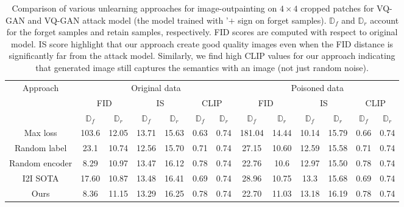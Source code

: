 \begin{table*}[h]
    \centering
    \begin{tabular}{ccccccc||cccccc}
      \toprule
      \multirow{3}{*}{Approach} & \multicolumn{6}{c||}{Original data} & \multicolumn{6}{c}{Poisoned data} \\
      & \multicolumn{2}{c}{FID} & \multicolumn{2}{c}{IS} & \multicolumn{2}{c||}{CLIP} & \multicolumn{2}{c}{FID} & \multicolumn{2}{c}{IS} & \multicolumn{2}{c}{CLIP} \\ \cline{2-13}
      & $\mathbb{D}_f$ & $\mathbb{D}_r$ & $\mathbb{D}_f$ & $\mathbb{D}_r$ & $\mathbb{D}_f$ & $\mathbb{D}_r$ & $\mathbb{D}_f$ & $\mathbb{D}_r$ & $\mathbb{D}_f$ & $\mathbb{D}_r$ & $\mathbb{D}_f$ & $\mathbb{D}_r$ \\
      \hline
      Max loss & 103.6 & 12.05 & 13.71 & 15.63 & 0.63 & 0.74 & 181.04 & 14.44 & 10.14 & 15.79 & 0.66 & 0.74 \\
      Random label & 23.1 & 10.74 & 12.56 & 15.70 & 0.71 & 0.74 & 27.15 & 10.60 & 12.59 & 15.58 & 0.71 & 0.74 \\
      Random encoder & 8.29 & 10.97 & 13.47 & 16.12 & 0.78 & 0.74 & 22.76 & 10.6 & 12.97 & 15.50 & 0.78 & 0.74 \\
      I2I SOTA & 17.60 & 10.87 & 13.48 & 16.41 & 0.69 & 0.74 & 28.96 & 10.75 & 13.3 & 15.68 & 0.69 & 0.74 \\
      Ours & 8.36 & 11.15 & 13.29 & 16.25 & 0.78 & 0.74 & 22.70 & 11.03 & 13.18 & 16.19 & 0.78 & 0.74 \\
      \bottomrule
    \end{tabular}
    \caption{Comparison of various unlearning approaches for image-outpainting on $4\times4$ cropped patches for VQ-GAN and VQ-GAN attack model (the model trained with '$+$ sign on forget samples). $\mathbb{D}_f$ and $\mathbb{D}_r$ account for the forget samples and retain samples, respectively. FID scores are computed with respect to original model. IS score highlight that our approach create good quality images even when the FID distance is significantly far from the attack model. Similarly, we find high CLIP values for our approach indicating that generated image still captures the semantics with an image (not just random noise).}
    \label{tab:VQ-GAN_results_outpaint4x4original}
\end{table*}

